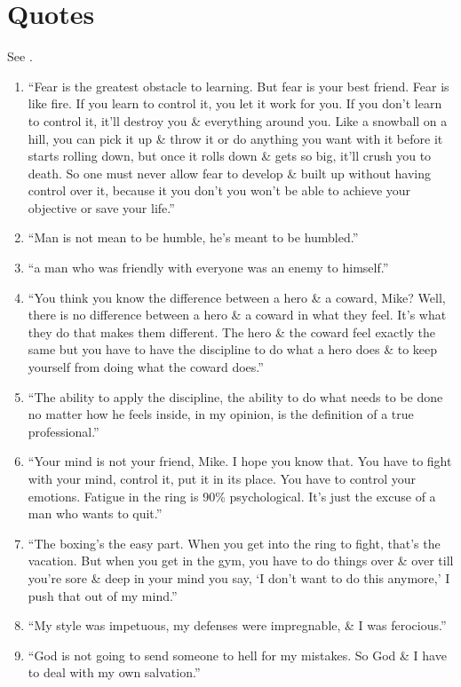 \documentclass{article}
\numberwithin{equation}{section}
\begin{document}
\section{Quotes}
See \cite{Tyson_Sloman2013}.
\begin{enumerate}
	\item ``Fear is the greatest obstacle to learning. But fear is your best friend. Fear is like fire. If you learn to control it, you let it work for you. If you don't learn to control it, it'll destroy you \& everything around you. Like a snowball on a hill, you can pick it up \& throw it or do anything you want with it before it starts rolling down, but once it rolls down \& gets so big, it'll crush you to death. So one must never allow fear to develop \& built up without having control over it, because it you don't you won't be able to achieve your objective or save your life.''
	\item ``Man is not mean to be humble, he's meant to be humbled.''
	\item ``a man who was friendly with everyone was an enemy to himself.''
	\item ``You think you know the difference between a hero \& a coward, Mike? Well, there is no difference between a hero \& a coward in what they feel. It's what they do that makes them different. The hero \& the coward feel exactly the same but you have to have the discipline to do what a hero does \& to keep yourself from doing what the coward does.''
	\item ``The ability to apply the discipline, the ability to do what needs to be done no matter how he feels inside, in my opinion, is the definition of a true professional.''
	\item ``Your mind is not your friend, Mike. I hope you know that. You have to fight with your mind, control it, put it in its place. You have to control your emotions. Fatigue in the ring is 90\% psychological. It's just the excuse of a man who wants to quit.''
	\item ``The boxing's the easy part. When you get into the ring to fight, that's the vacation. But when you get in the gym, you have to do things over \& over till you're sore \& deep in your mind you say, `I don't want to do this anymore,' I push that out of my mind.''
	\item ``My style was impetuous, my defenses were impregnable, \& I was ferocious.''
	\item ``God is not going to send someone to hell for my mistakes. So God \& I have to deal with my own salvation.''

\end{enumerate}
\end{document}
